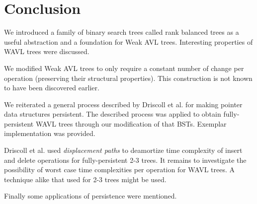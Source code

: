 \chapter*{Conclusion}

We introduced a family of binary search trees called rank balanced trees as a useful abstraction and a foundation for Weak AVL trees. Interesting properties of WAVL trees were discussed.

We modified Weak AVL trees to only require a constant number of change per operation (preserving their structural properties). This construction is not known to have been discovered earlier.

We reiterated a general process described by Driscoll et al.\cite{persistence-DSST} for making pointer data structures persistent. The described process was applied to obtain fully-persistent WAVL trees through our modification of that BSTs. Exemplar implementation was provided.

Driscoll et al. used \textit{displacement paths} to deamortize time complexity of insert and delete operations for fully-persistent 2-3 trees. It remains to investigate the possibility of worst case time complexities per operation for WAVL trees. A technique alike that used for 2-3 trees might be used.

Finally some applications of persistence were mentioned.